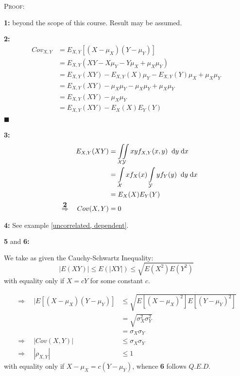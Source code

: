 \documentclass[12pt,a4paper]{article}
\newcommand{\imply}{\quad\Rightarrow\quad}
\newcommand{\diff}{\;\mathrm{d}}
\begin{document}
\noindent\textsc{Proof:}\par\vspace{1cm}

\noindent\textbf{1: } beyond the scope of this course. Result may be assumed.

\noindent\textbf{2: } \begin{align*}
Cov_{X,Y} &= E_{{X,Y}}[(X-\mu_X)(Y-\mu_Y)]\\
&= E_{{X,Y}}(XY - X\mu_Y - Y\mu_X + \mu_X\mu_Y)\\
&= E_{{X,Y}}(XY) - E_{X,Y}(X)\mu_Y - E_{{X,Y}}(Y)\mu_X + \mu_X\mu_Y\\
&= E_{{X,Y}}(XY) - \mu_X\mu_Y - \mu_X\mu_Y + \mu_X\mu_Y\\
&= E_{{X,Y}}(XY) - \mu_X\mu_Y\\
&= E_{{X,Y}}(XY) - E_{X}(X)E_{Y}(Y)
\end{align*}
\hfill$\blacksquare$

\noindent\textbf{3: }
\begin{align*}
E_{X,Y}(XY) &= \iint\limits_{\mathcal{X}\mathcal{Y}} xyf_{X,Y}(x,y)\;\diff y\diff x\\
&= \int\limits_{\mathcal{X}} xf_X(x) \int\limits_{\mathcal{Y}} yf_Y(y) \;\diff y \diff x\\
&= E_X(X)E_Y(Y)\\
\overset{\mbox{\bf 2}}{\imply} Cov(X,Y) &= 0
\end{align*}

\noindent\textbf{4: } See example \ref{uncorrelated, dependent}.

\noindent\textbf{5} and \textbf{6: }

\noindent We take as given the Cauchy-Schwartz Inequality:
$$|E(XY)| \leq E(|XY|) \leq \sqrt{E(X^2)E(Y^2)}$$
with equality only if $X = cY$ for some constant $c$.

\begin{align*}
\Rightarrow\quad |E[(X-\mu_X)(Y-\mu_Y)] &\leq \sqrt{E[(X-\mu_X)^2]E[(Y-\mu_Y)^2]}\\
&= \sqrt{\sigma_X^2\sigma_Y^2}\\
&= \sigma_X\sigma_Y\\
\Rightarrow \quad |Cov(X,Y)| &\leq \sigma_X\sigma_Y\\
\Rightarrow\quad |\rho_{X,Y}| &\leq 1
\end{align*}
with equality only if $X-\mu_X = c(Y-\mu_Y)$, whence \textbf{6} follows \hfill$Q.E.D.$
\end{document}
